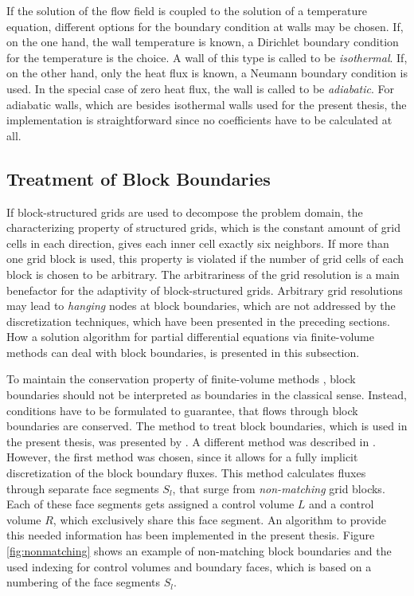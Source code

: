 If the solution of the flow field is coupled to the solution of a temperature equation, different options for the boundary condition at walls may be chosen. If, on the one hand, the wall temperature is known, a Dirichlet boundary condition for the temperature is the choice. A wall of this type is called to be \emph{isothermal}. If, on the other hand, only the heat flux is known, a Neumann boundary condition is used. In the special case of zero heat flux, the wall is called to be \emph{adiabatic}. For adiabatic walls, which are besides isothermal walls used for the present thesis, the implementation is straightforward since no coefficients have to be calculated at all.

\subsection{Treatment of Block Boundaries}
\label{sec:blockboundaries}

If block-structured grids are used to decompose the problem domain, the characterizing property of structured grids, which is the constant amount of grid cells in each direction, gives each inner cell exactly six neighbors. If more than one grid block is used, this property is violated if the number of grid cells of each block is chosen to be arbitrary. The arbitrariness of the grid resolution is a main benefactor for the adaptivity of block-structured grids. Arbitrary grid resolutions may lead to \emph{hanging} nodes at block boundaries, which are not addressed by the discretization techniques, which have been presented in the preceding sections. How a solution algorithm for partial differential equations via finite-volume methods can deal with block boundaries, is presented in this subsection.

To maintain the conservation property of finite-volume methods \cite{schaefer99}, block boundaries should not be interpreted as boundaries in the classical sense. Instead, conditions have to be formulated to guarantee, that flows through block boundaries are conserved. The method to treat block boundaries, which is used in the present thesis, was presented by \cite{lilek97}. A different method was described in \cite{lange02}. However, the first method was chosen, since it allows for a fully implicit discretization of the block boundary fluxes. This method calculates fluxes through separate face segments \(S_l\), that surge from \emph{non-matching} grid blocks. Each of these face segments gets assigned a control volume \(L\) and a control volume \(R\), which exclusively share this face segment. An algorithm to provide this needed information has been implemented in the present thesis. Figure \ref{fig:nonmatching} shows an example of non-matching block boundaries and the used indexing for control volumes and boundary faces, which is based on a numbering of the face segments \(S_l\).

